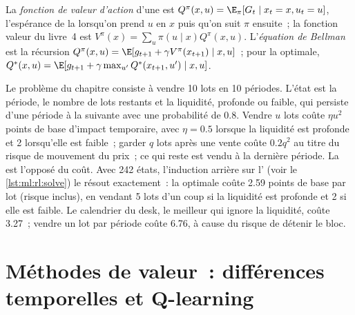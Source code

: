 \begin{definition}\label{def:ml:reinforcement-learning-foundations:bellman}
La \emph{fonction de valeur d'action} d'une  est $Q^\pi(x, u) = \E_\pi[G_t\mid x_t = x, u_t = u]$,
l'espérance de la  lorsqu'on prend $u$ en $x$ puis qu'on suit $\pi$ ensuite~; la fonction valeur du livre~4 est $V^\pi(x)
= \sum_u\pi(u\mid x)Q^\pi(x, u)$. L'\emph{équation de Bellman} est la récursion $Q^\pi(x, u) =
\E[g_{t+1} + \gamma V^\pi(x_{t+1})\mid x, u]$~; pour la  optimale, $Q^*(x, u) = \E[g_{t+1} + \gamma\max_{u'}Q^*(x_{t+1},
u')\mid x, u]$.
\end{definition}

Le problème du chapitre consiste à vendre 10 lots en 10 périodes. L'état est la période, le nombre de lots restants et la liquidité, profonde ou
faible, qui persiste d'une période à la suivante avec une probabilité de 0.8. Vendre $u$ lots coûte $\eta u^2$ points de base
d'impact temporaire, avec $\eta = 0.5$ lorsque la liquidité est profonde et 2 lorsqu'elle est faible~; garder $q$ lots après une vente coûte $0.2
q^2$ au titre du risque de mouvement du prix~; ce qui reste est vendu à la dernière période. La  est l'opposé du coût. Avec 242
états, l'induction arrière sur l' (voir le \cref{lst:ml:rl:solve}) le résout exactement~: la  optimale coûte
2.59 points de base par lot (risque inclus), en vendant 5 lots d'un coup si la liquidité est profonde et 2 si elle est faible. Le calendrier
du desk, le meilleur qui ignore la liquidité, coûte 3.27~; vendre un lot par période coûte 6.76, à cause du risque de
détenir le bloc.

\section{Méthodes de valeur~: différences temporelles et Q-learning}

